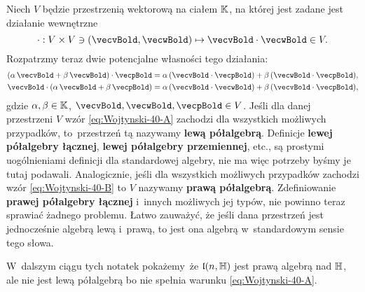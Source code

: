 \documentclass[a4paper,11pt]{article}
\numberwithin{equation}{section}
\begin{document}
Niech $V$ będzie przestrzenią wektorową na ciałem $\mathbb{K}$, na której jest
zadane jest działanie wewnętrzne
\begin{equation}
  \label{eq:Wojtynsi-39}
  \cdot : V \times V \ni ( \vecvBold, \vecwBold ) \mapsto \vecvBold \cdot \vecwBold \in V.
\end{equation}
Rozpatrzmy teraz dwie potencjalne własności tego działania:
\begin{subequations}
  \begin{align}
    \label{eq:Wojtynski-40-A}
    &( \alpha \, \vecvBold + \beta \, \vecwBold ) \cdot \vecpBold =
      \alpha \, ( \vecvBold \cdot \vecpBold ) + \beta \, ( \vecwBold \cdot \vecpBold ), \\
    \label{eq:Wojtynski-40-B}
    &\vecvBold \cdot ( \alpha \, \vecwBold + \beta \, \vecpBold ) =
      \alpha \, ( \vecvBold \cdot \vecwBold ) + \beta \, ( \vecvBold \cdot \vecpBold ),
  \end{align}
\end{subequations}
gdzie $\alpha, \beta \in \mathbb{K}$, $\vecvBold, \vecwBold, \vecpBold \in V$. Jeśli dla
danej przestrzeni $V$ wzór \eqref{eq:Wojtynski-40-A} zachodzi dla
wszystkich możliwych przypadków, to~przestrzeń tą nazywamy \textbf{lewą
  półalgebrą}. Definicje \textbf{lewej półalgebry łącznej}, \textbf{lewej
  półalgebry przemiennej}, etc., są prostymi uogólnieniami definicji dla
standardowej algebry, nie ma więc potrzeby byśmy je tutaj podawali.
Analogicznie, jeśli dla wszystkich
możliwych przypadków zachodzi wzór \eqref{eq:Wojtynski-40-B} to $V$ nazywamy
\textbf{prawą półalgebrą}. Zdefiniowanie \textbf{prawej półalgebry łącznej}
i~innych możliwych jej typów, nie powinno teraz sprawiać żadnego problemu.
Łatwo zauważyć, że jeśli dana przestrzeń jest jednocześnie algebrą lewą
i~prawą, to jest ona algebrą w~standardowym sensie tego słowa.

W~dalszym ciągu tych notatek pokażemy~że $\mathfrak{l}( n, \mathbb{H} )$ jest prawą
algebrą nad $\mathbb{H}$, ale nie jest lewą półalgebrą bo nie spełnia warunku
\eqref{eq:Wojtynski-40-A}.
\end{document}
